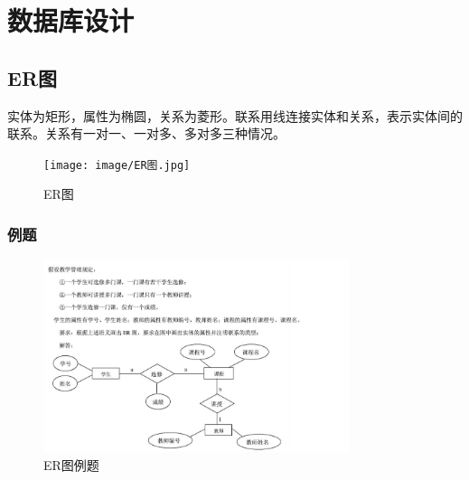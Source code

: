 \section{数据库设计}
\subsection{ER图}
实体为矩形，属性为椭圆，关系为菱形。联系用线连接实体和关系，表示实体间的联系。关系有一对一、一对多、多对多三种情况。
\begin{figure}[H]
\centering
\texttt{[image: image/ER图.jpg]}
\caption{ER图}
\end{figure}
\subsubsection{例题}
\begin{figure}[H]
\centering
\includegraphics[width=0.8\textwidth]{image/ER图例题.png}
\caption{ER图例题}
\end{figure}

